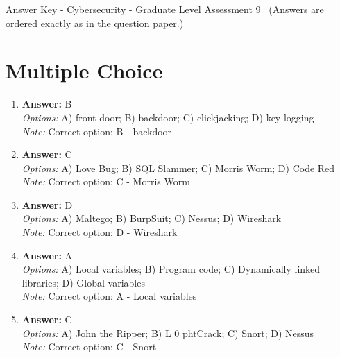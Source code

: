 \documentclass[12pt]{article}
\begin{document}
\begin{center}
Answer Key - Cybersecurity - Graduate Level Assessment 9 \
\small (Answers are ordered exactly as in the question paper.)
\end{center}

\section*{Multiple Choice}
\begin{enumerate}[label=\arabic*.]
\item \textbf{Answer:} B
\\ \textit{Options:} A) front-door; B) backdoor; C) clickjacking; D) key-logging
\\ \textit{Note:} Correct option: B - backdoor
\item \textbf{Answer:} C
\\ \textit{Options:} A) Love Bug; B) SQL Slammer; C) Morris Worm; D) Code Red
\\ \textit{Note:} Correct option: C - Morris Worm
\item \textbf{Answer:} D
\\ \textit{Options:} A) Maltego; B) BurpSuit; C) Nessus; D) Wireshark
\\ \textit{Note:} Correct option: D - Wireshark
\item \textbf{Answer:} A
\\ \textit{Options:} A) Local variables; B) Program code; C) Dynamically linked libraries; D) Global variables
\\ \textit{Note:} Correct option: A - Local variables
\item \textbf{Answer:} C
\\ \textit{Options:} A) John the Ripper; B) L 0 phtCrack; C) Snort; D) Nessus
\\ \textit{Note:} Correct option: C - Snort
\end{enumerate}
\end{document}
